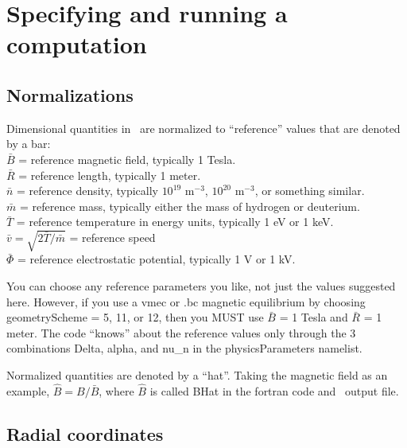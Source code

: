 \chapter{Specifying and running a computation}

\section{Normalizations}

{\setlength{\parindent}{0cm}
Dimensional quantities in \sfincs~are normalized to ``reference'' values that are denoted by a bar:\\
$\bar{B}$ = reference magnetic field, typically 1 Tesla.\\
$\bar{R}$ = reference length, typically 1 meter.\\
$\bar{n}$ = reference density, typically $10^{19}$ m$^{-3}$, $10^{20}$ m$^{-3}$, or something similar.\\
$\bar{m}$ = reference mass, typically either the mass of hydrogen or deuterium.\\
$\bar{T}$ = reference temperature in energy units, typically 1 eV or 1 keV.\\
$\bar{v} = \sqrt{2 \bar{T} / \bar{m}}$ = reference speed\\
$\bar{\Phi}$ = reference electrostatic potential, typically 1 V or 1 kV.\\
}

You can choose any reference parameters you like, not just the values
suggested here. However, if you use a {\ttfamily vmec} or {\ttfamily .bc} magnetic equilibrium
by choosing {\ttfamily geometryScheme} = 5, 11, or 12, then you MUST use $\bar{B}$ = 1 Tesla and $\bar{R}$ = 1 meter.
The code ``knows'' about the reference values only through
the 3 combinations {\ttfamily Delta}, {\ttfamily alpha}, and {\ttfamily nu\_n}
in the {\ttfamily physicsParameters} namelist.

Normalized quantities are denoted by a ``hat''.  Taking the magnetic field as an example,
$\hat{B}=B/\bar{B}$, where $\hat{B}$ is called {\ttfamily BHat} in the fortran code and \HDF~output file.

\section{Radial coordinates}
\label{sec:radialCoordinates}

